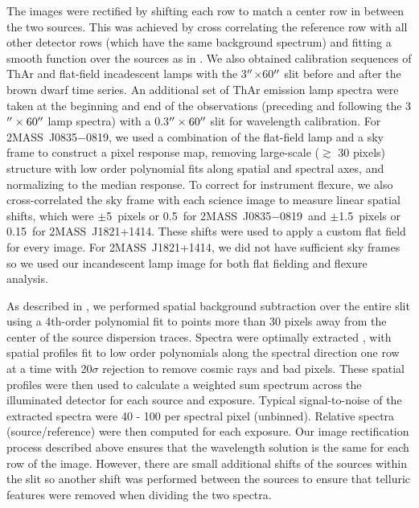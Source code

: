 \documentclass[twocolumn]{aastex6}
\newcommand{\sha}{2MASS~J0835$-$0819}
\newcommand{\shb}{2MASS~J1821+1414}
\begin{document}
The images were rectified by shifting each row to match a center row in between the two sources.
This was achieved by cross correlating the reference row with all other detector rows (which have the same background spectrum) and fitting a smooth function over the sources as in \citealt{2016ApJ...826..156S}.
We also obtained calibration sequences of ThAr and flat-field incadescent lamps with the 3$\mbox{$^{\prime\prime}$}$$\times$60$\mbox{$^{\prime\prime}$}$ slit  before and after the brown dwarf time series.
An additional set of ThAr emission lamp spectra were taken at the beginning and end of the observations (preceding and following the 3$\mbox{$^{\prime\prime}$} \times 60 \mbox{$^{\prime\prime}$}$ lamp spectra) with a 0.3$\mbox{$^{\prime\prime}$}\times60\mbox{$^{\prime\prime}$}$ slit for wavelength calibration.
For {\sha}, we used a combination of the flat-field lamp and a sky frame to construct a pixel response map, removing large-scale ($\gtrsim$ 30 pixels) structure with low order polynomial fits along spatial and spectral axes, and normalizing to the median response. 
To correct for instrument flexure, we also cross-correlated the sky frame with each science image to measure linear spatial shifts, which were $\pm$5~pixels or 0.5\arcsec\ for \sha\ and $\pm$1.5~pixels or 0.15\arcsec\ for \shb.
These shifts were used to apply a custom flat field for every image.
For {\shb}, we did not have sufficient sky frames so we used our incandescent lamp image for both flat fielding and flexure analysis.

As described in \citet{2016ApJ...826..156S}, we performed spatial background subtraction over the entire slit using a 4th-order polynomial fit to points more than 30 pixels away from the center of the source dispersion traces.  Spectra were optimally extracted \citep{1986ApJ...302..757H}, with spatial profiles fit to low order polynomials along the spectral direction one row at a time with 20$\sigma$ rejection to remove cosmic rays and bad pixels.
These spatial profiles were then used to calculate a weighted sum spectrum across the illuminated detector for each source and exposure. 
Typical signal-to-noise of the extracted spectra were 40 - 100 per spectral pixel (unbinned).
Relative spectra (source/reference) were then computed for each exposure.
Our image rectification process described above ensures that the wavelength solution is the same for each row of the image.
However, there are small additional shifts of the sources within the slit so another shift was performed between the sources to ensure that telluric features were removed when dividing the two spectra.
\end{document}
